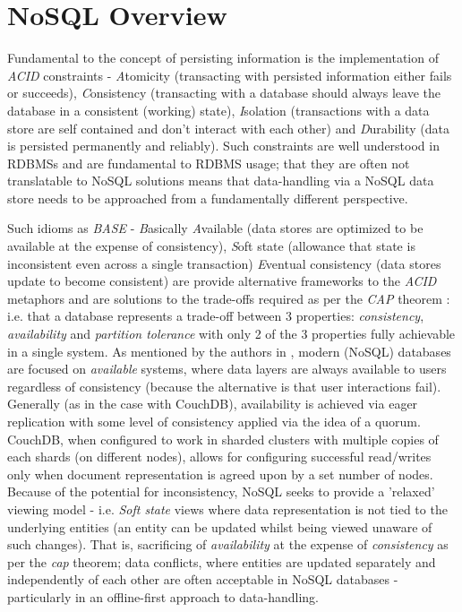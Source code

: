 \section{NoSQL Overview}
Fundamental to the concept of persisting information is the implementation of \textit{ACID} constraints - \textit{A}tomicity (transacting with persisted information either fails or succeeds), \textit{C}onsistency (transacting with a database should always leave the database in a consistent (working) state), \textit{I}solation (transactions with a data store are self contained and don't interact with each other) and \textit{D}urability (data is persisted permanently and reliably). Such constraints are well understood in RDBMSs and are fundamental to RDBMS usage; that they are often not translatable to NoSQL solutions means that data-handling via a NoSQL data store needs to be approached from a fundamentally different perspective.

Such idioms as \textit{BASE} - \textit{B}asically \textit{A}vailable (data stores are optimized to be available at the expense of consistency), \textit{S}oft state (allowance that state is inconsistent even across a single transaction) \textit{E}ventual consistency (data stores update to become consistent) are provide alternative frameworks to the \textit{ACID} metaphors and are solutions to the trade-offs required as per the \textit{CAP} theorem \cite{GANESHCHANDRA201513}: i.e. that a database represents a trade-off between 3 properties: \textit{consistency}, \textit{availability} and \textit{partition tolerance} with only 2 of the 3 properties fully achievable in a single system. As mentioned by the authors in \cite{GANESHCHANDRA201513}, modern (NoSQL) databases are focused on \textit{available} systems, where data layers are always available to users regardless of consistency (because the alternative is that user interactions fail). Generally (as in the case with CouchDB), availability is achieved via eager replication with some level of consistency applied via the idea of a quorum. CouchDB, when configured to work in sharded clusters with multiple copies of each shards (on different nodes), allows for configuring successful read/writes only when document representation is agreed upon by a set number of nodes. Because of the potential for inconsistency, NoSQL seeks to provide a 'relaxed' viewing model - i.e. \textit{Soft state} views where data representation is not tied to the underlying entities (an entity can be updated whilst being viewed unaware of such changes). That is, sacrificing of \textit{availability} at the expense of \textit{consistency} as per the \textit{cap} theorem; data conflicts, where entities are updated separately and independently of each other are often acceptable in NoSQL databases - particularly in an offline-first approach to data-handling.


